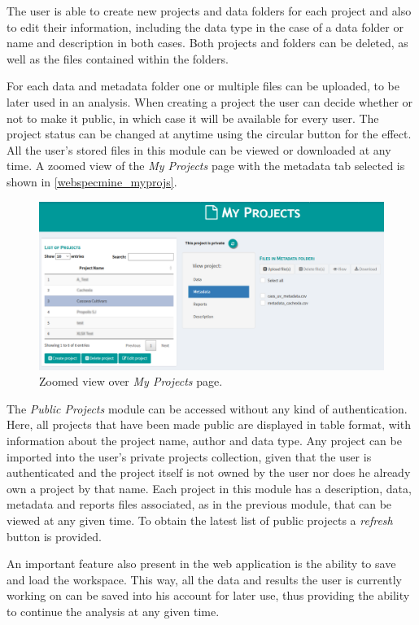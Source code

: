 The user is able to create new projects and data folders for each project and also to edit their information, including the data type in the case of a data folder or name and description in both cases. Both projects and folders can be deleted, as well as the files contained within the folders.

For each data and metadata folder one or multiple files can be uploaded, to be later used in an analysis. When creating a project the user can decide whether or not to make it public, in which case it will be available for every user. The project status can be changed at anytime using the circular button for the effect. All the user's stored files in this module can be viewed or downloaded at any time. A zoomed view of the \textit{My Projects} page with the metadata tab selected is shown in \autoref{webspecmine_myprojs}.

\begin{figure}[h]
	\centering
	\includegraphics[width=0.9\linewidth]{Imagens/webspecmine_myprojs}
	\caption{Zoomed view over \textit{My Projects} page.}
	\label{webspecmine_myprojs}
\end{figure}

The \textit{Public Projects} module can be accessed without any kind of authentication. Here, all projects that have been made public are displayed in table format, with information about the project name, author and data type. Any project can be imported into the user's private projects collection, given that the user is authenticated and the project itself is not owned by the user nor does he already own a project by that name. Each project in this module has a description, data, metadata and reports files associated, as in the previous module, that can be viewed at any given time. To obtain the latest list of public projects a \textit{refresh} button is provided.

An important feature also present in the web application is the ability to save and load the workspace. This way, all the data and results the user is currently working on can be saved into his account for later use, thus providing the ability to continue the analysis at any given time.

